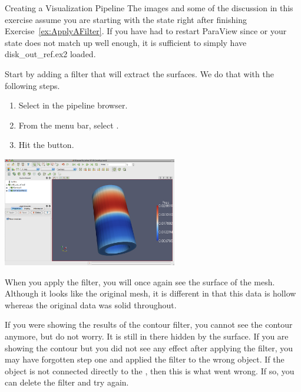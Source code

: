 \begin{exercise}{Creating a Visualization Pipeline}
  \label{ex:CreatingAVisualizationPipeline}
  The images and some of the discussion in this exercise assume you are
  starting with the state right after finishing
  Exercise~\ref{ex:ApplyAFilter}.  If you have had to restart ParaView
  since or your state does not match up well enough, it is sufficient to
  simply have disk\_out\_ref.ex2 loaded.

  Start by adding a filter that will extract the surfaces.  We do that with
  the following steps.

  \begin{enumerate}
  \item Select  in the pipeline browser.
  \item From the menu bar, select  \ra {} \ra
    . 
  \item Hit the \apply button.
    \savecounter
  \end{enumerate}

  \begin{inlinefig}
    \includegraphics[width=3in]{images/CutSurface1}
  \end{inlinefig}

  When you apply the  filter, you will once again see
  the surface of the mesh.  Although it looks like the original mesh, it is
  different in that this data is hollow whereas the original data was solid
  throughout.

  If you were showing the results of the contour filter, you cannot see the
  contour anymore, but do not worry.  It is still in there hidden by the
  surface.  If you are showing the contour but you did not see any effect
  after applying the filter, you may have forgotten step one and applied
  the filter to the wrong object.  If the  object is
  not connected directly to the , then this is what
  went wrong.  If so, you can delete the filter and try again.


\end{exercise}
